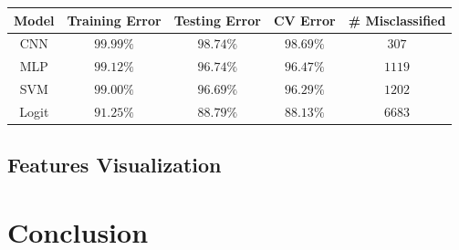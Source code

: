 \message{ !name(main.tex)}\documentclass[11pt]{article}
\begin{document}
\begin{center}
  \begin{tabular}{|c|c|c|c|c|}
    \hline
    Model & Training Error & Testing Error & CV Error & \# Misclassified\\
    \hline
    CNN & $99.99\%$ & $98.74\%$ & $98.69\%$ & $307$ \\
    \hline
    MLP & $99.12\%$ & $96.74\%$ & $96.47\%$ & $1119$ \\
    \hline
    SVM & $99.00\%$ & $96.69\%$ & $96.29\%$ & $1202$ \\
    \hline
    Logit & $91.25\%$ & $88.79\%$ & $88.13\%$ & $6683$ \\
    \hline
  \end{tabular}
\end{center}



\subsection{Features Visualization}


\section{Conclusion}



\printbibliography
\end{document}
